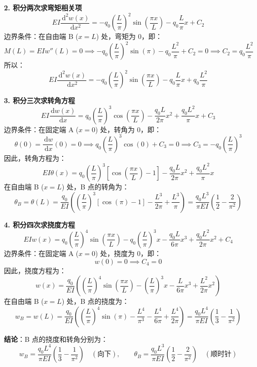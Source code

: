 \documentclass[UTF8,fontset=windows]{ctexart}
\newcommand{\diff}{\,\mathrm{d}}
\begin{document}
\textbf{2. 积分两次求弯矩相关项}
\[
    EI \frac{\diff^2 w(x)}{\diff x^2} = -q_0 \left(\frac{L}{\pi}\right)^2 \sin\left(\frac{\pi x}{L}\right) - q_0 \frac{L}{\pi} x + C_2
\]
边界条件：在自由端 B ($x = L$) 处，弯矩为 0，即：
\[
    M(L) = EI w''(L) = 0 \implies -q_0 \left(\frac{L}{\pi}\right)^2 \sin(\pi) - q_0 \frac{L^2}{\pi} + C_2 = 0 \implies C_2 = q_0 \frac{L^2}{\pi}
\]
所以：
\[
    EI \frac{\diff^2 w(x)}{\diff x^2} = -q_0 \left(\frac{L}{\pi}\right)^2 \sin\left(\frac{\pi x}{L}\right) - q_0 \frac{L}{\pi} x + q_0 \frac{L^2}{\pi}
\]

\textbf{3. 积分三次求转角方程}
\[
    EI \frac{\diff w(x)}{\diff x} = q_0 \left(\frac{L}{\pi}\right)^3 \cos\left(\frac{\pi x}{L}\right) - \frac{q_0 L}{2\pi} x^2 + \frac{q_0 L^2}{\pi} x + C_3
\]
边界条件：在固定端 A ($x = 0$) 处，转角为 0，即：
\[
    \theta(0) = \frac{\diff w}{\diff x}(0) = 0 \implies q_0 \left(\frac{L}{\pi}\right)^3 \cos(0) + C_3 = 0 \implies C_3 = -q_0 \left(\frac{L}{\pi}\right)^3
\]
因此，转角方程为：
\[
    EI \theta(x) = q_0 \left(\frac{L}{\pi}\right)^3 \left[\cos\left(\frac{\pi x}{L}\right) - 1\right] - \frac{q_0 L}{2\pi} x^2 + \frac{q_0 L^2}{\pi} x
\]
在自由端 B ($x = L$) 处，B 点的转角为：
\[
    \theta_B = \theta(L) = \frac{q_0}{EI} \left( \left(\frac{L}{\pi}\right)^3 [\cos(\pi) - 1] - \frac{L^3}{2\pi} + \frac{L^3}{\pi} \right) = \frac{q_0 L^3}{\pi EI} \left( \frac{1}{2} - \frac{2}{\pi^2} \right)
\]

\textbf{4. 积分四次求挠度方程}
\[
    EI w(x) = q_0 \left(\frac{L}{\pi}\right)^4 \sin\left(\frac{\pi x}{L}\right) - q_0 \left(\frac{L}{\pi}\right)^3 x - \frac{q_0 L}{6\pi} x^3 + \frac{q_0 L^2}{2\pi} x^2 + C_4
\]
边界条件：在固定端 A ($x = 0$) 处，挠度为 0，即：
\[
    w(0) = 0 \implies C_4 = 0
\]
因此，挠度方程为：
\[
    w(x) = \frac{q_0}{EI} \left( \left(\frac{L}{\pi}\right)^4 \sin\left(\frac{\pi x}{L}\right) - \left(\frac{L}{\pi}\right)^3 x - \frac{L}{6\pi} x^3 + \frac{L^2}{2\pi} x^2 \right)
\]
在自由端 B ($x = L$) 处，B 点的挠度为：
\[
    w_B = w(L) = \frac{q_0}{EI} \left( \left(\frac{L}{\pi}\right)^4 \sin(\pi) - \frac{L^4}{\pi^3} - \frac{L^4}{6\pi} + \frac{L^4}{2\pi} \right) = \frac{q_0 L^4}{\pi EI} \left( \frac{1}{3} - \frac{1}{\pi^2} \right)
\]

\textbf{结论}：B 点的挠度和转角分别为：
\[
    w_B = \frac{q_0 L^4}{\pi EI} \left( \frac{1}{3} - \frac{1}{\pi^2} \right) \quad (\text{向下}), \qquad \theta_B = \frac{q_0 L^3}{\pi EI} \left( \frac{1}{2} - \frac{2}{\pi^2} \right) \quad (\text{顺时针})
\]

\newpage
\end{document}
